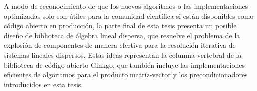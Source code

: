 A modo de reconocimiento de que los nuevos algoritmos o las implementaciones
optimizadas solo son útiles para la comunidad científica si están disponibles
como código abierto en producción, la parte final de esta tesis presenta un
posible diseño de biblioteca de álgebra lineal dispersa, que resuelve el
problema de la explosión de componentes de manera efectiva para la resolución
iterativa de sistemas lineales dispersos. Estas ideas representan la columna
vertebral de la biblioteca de código abierto Ginkgo, que también incluye las
implementaciones eficientes de algoritmos para el producto matriz-vector y los
precondicionadores introducidos en esta tesis.
